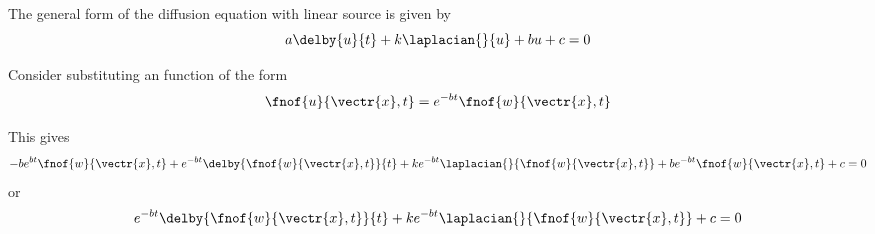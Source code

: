 The general form of the \OpenCMISS diffusion equation with linear source is
given by
\begin{equation}
  a\delby{u}{t}+k\laplacian{}{u}+bu+c=0
\end{equation}

Consider substituting an function of the form
\begin{equation}
  \fnof{u}{\vectr{x},t}=e^{-bt}\fnof{w}{\vectr{x},t}
\end{equation}

This gives
\begin{equation}
  -be^{bt}\fnof{w}{\vectr{x},t}+e^{-bt}\delby{\fnof{w}{\vectr{x},t}}{t}+ke^{-bt}\laplacian{}{\fnof{w}{\vectr{x},t}}+be^{-bt}\fnof{w}{\vectr{x},t}+c=0
\end{equation}
or
\begin{equation}
  e^{-bt}\delby{\fnof{w}{\vectr{x},t}}{t}+ke^{-bt}\laplacian{}{\fnof{w}{\vectr{x},t}}+c=0
\end{equation}
  
